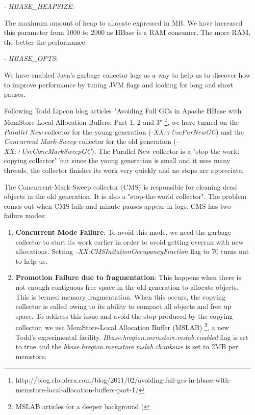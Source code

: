 \begin{enumerate}
- \textit{HBASE\_HEAPSIZE}: 
\par
The maximum amount of heap to allocate expressed in MB. We have increased this parameter from 1000 to 2000 as HBase is a RAM consumer. The more RAM, the better the performance.
\par
- \textit{HBASE\_OPTS}:
\par
We have enabled Java's garbage collector logs as a way to help us to discover how to improve performance by tuning JVM flags and looking for long and short pauses. 
\par
Following Todd Lipcon blog articles "Avoiding Full GCs in Apache HBase with MemStore-Local Allocation Buffers: Part 1, 2 and 3" \footnote{http://blog.cloudera.com/blog/2011/02/avoiding-full-gcs-in-hbase-with-memstore-local-allocation-buffers-part-1/}, we have turned on the \textit{Parallel New} collector for the young generation (\textit{-XX:+UseParNewGC}) and the \textit{Concurrent Mark-Sweep} collector for the old generation (\textit{-XX:+UseConcMarkSweepGC}). The Parallel New collector is a "stop-the-world copying collector" but since the young generation is small and it uses many threads, the collector finishes its work very quickly and no stops are appreciate.
\par
The Concurrent-Mark-Sweep collector (CMS) is responsible for cleaning dead objects in the old generation. It is also a "stop-the-world collector". The problem comes out when CMS fails and minute pauses appear in logs. CMS has two failure modes:
\begin{enumerate}
\item \textbf{Concurrent Mode Failure}: To avoid this mode, we need the garbage collector to start its work earlier in order to avoid getting overrun with new allocations. Setting \textit{-XX:CMSInitationOccupancyFraction} flag to 70 turns out to help us.
\item \textbf{Promotion Failure due to fragmentation}: This happens when there is not enough contiguous free space in the old-generation to allocate objects. This is termed memory fragmentation. When this occurs, the copying collector is called owing to its ability to compact all objects and free up space. To address this issue and avoid the stop produced by the copying collector, we use MemStore-Local Allocation Buffer (MSLAB) \footnote{MSLAB articles for a deeper background \cite{ApacheHBaseMSLAB} \cite{MSLAB})}, a new Todd's experimental facility.  \textit{Hbase.hregion.memstore.mslab.enabled} flag is set to true and the \textit{hbase.hregion.memstore.mslab.chunksize} is set to 2MB per memstore.


\end{enumerate}
\end{enumerate}
